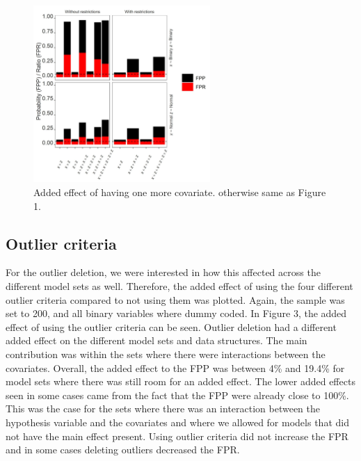 \begin{figure}[t]
\includegraphics[width=0.6\textwidth]{R/Analysis/Result/Figures/Figure1C.jpeg}
\centering
\caption{Added effect of having one more covariate. otherwise same as Figure 1.}
\label{fig:mainfigure}
\end{figure}

\subsection{Outlier criteria}
For the outlier deletion, we were interested in how this affected across the different model sets as well. Therefore, the added effect of using the four different outlier criteria compared to not using them was plotted. Again, the sample was set to 200, and all binary variables where dummy coded. In Figure 3, the added effect of using the outlier criteria can be seen. Outlier deletion had a different added effect on the different model sets and data structures. The main contribution was within the sets where there were interactions between the covariates. Overall, the added effect to the FPP was between 4\% and 19.4\% for model sets where there was still room for an added effect. The lower added effects seen in some cases came from the fact that the FPP were already close to 100\%. This was the case for the sets where there was an interaction between the hypothesis variable and the covariates and where we allowed for models that did not have the main effect present. Using outlier criteria did not increase the FPR and in some cases deleting outliers decreased the FPR. 

